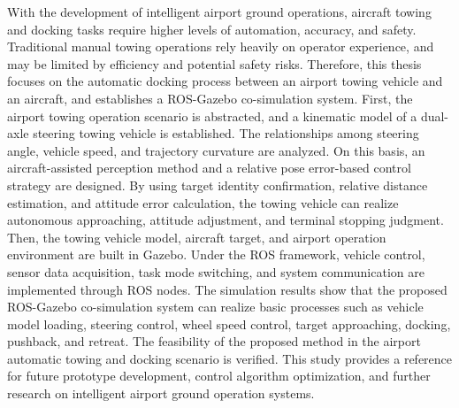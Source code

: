 \begin{abstracten}

    With the development of intelligent airport ground operations, aircraft towing and docking tasks require higher levels of automation, accuracy, and safety. Traditional manual towing operations rely heavily on operator experience, and may be limited by efficiency and potential safety risks. Therefore, this thesis focuses on the automatic docking process between an airport towing vehicle and an aircraft, and establishes a ROS-Gazebo co-simulation system.
    First, the airport towing operation scenario is abstracted, and a kinematic model of a dual-axle steering towing vehicle is established. The relationships among steering angle, vehicle speed, and trajectory curvature are analyzed. On this basis, an aircraft-assisted perception method and a relative pose error-based control strategy are designed. By using target identity confirmation, relative distance estimation, and attitude error calculation, the towing vehicle can realize autonomous approaching, attitude adjustment, and terminal stopping judgment. Then, the towing vehicle model, aircraft target, and airport operation environment are built in Gazebo. Under the ROS framework, vehicle control, sensor data acquisition, task mode switching, and system communication are implemented through ROS nodes.
    The simulation results show that the proposed ROS-Gazebo co-simulation system can realize basic processes such as vehicle model loading, steering control, wheel speed control, target approaching, docking, pushback, and retreat. The feasibility of the proposed method in the airport automatic towing and docking scenario is verified. This study provides a reference for future prototype development, control algorithm optimization, and further research on intelligent airport ground operation systems.
    
    



\end{abstracten}